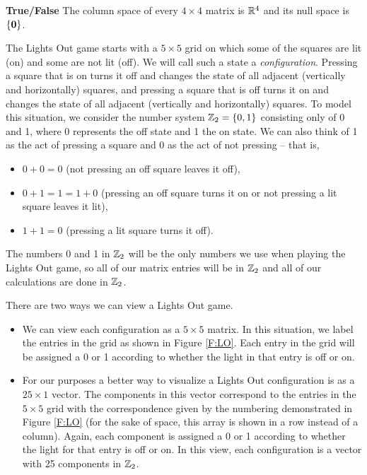 \item \textbf{True/False} The column space of every $4\times 4$ matrix is $\mathbb{R}^4$ and its null space is $\{\mathbf{0}\}$.

\ea

\ee

\label{sec:proj_lights_out}
The Lights Out game starts with a $5 \times 5$ grid on which some of the squares are lit (on) and some are not lit (off). We will call such a state a \emph{configuration}. Pressing a square that is on turns it off and changes the state of all adjacent (vertically and horizontally) squares, and pressing a square that is off turns it on and changes the state of all adjacent (vertically and horizontally) squares. To model this situation, we consider the number system $\mathbb{Z}_2 = \{0,1\}$ consisting only of 0 and 1, where 0 represents the off state and 1 the on state. We can also think of 1 as the act of pressing a square and 0 as the act of not pressing -- that is,
\begin{itemize}
\item $0+0 = 0$ (not pressing an off square leaves it off),
\item $0+1 = 1 = 1 + 0$ (pressing an off square turns it on or not pressing a lit square leaves it lit),
\item $1+1 = 0$ (pressing a lit square turns it off).
\end{itemize}

The numbers 0 and 1 in $\mathbb{Z}_2$ will be the only numbers we use when playing the Lights Out game, so all of our matrix entries will be in $\mathbb{Z}_2$ and all of our calculations are done in $\mathbb{Z}_2$. 

There are two ways we can view a Lights Out game.
\begin{itemize}
\item We can view each configuration as a $5 \times 5$ matrix. In this situation, we label the entries in the grid as shown in Figure \ref{F:LO}. Each entry in the grid will be assigned a 0 or 1 according to whether the light in that entry is off or on.

\item For our purposes a better way to visualize a Lights Out configuration is as a $25 \times 1$ vector. The components in this vector correspond to the entries in the $5 \times 5$ grid with the correspondence given by the numbering demonstrated in Figure \ref{F:LO} (for the sake of space, this array is shown in a row instead of a column). Again, each component is assigned a 0 or 1 according to whether the light for that entry is off or on. In this view, each configuration is a vector with 25 components in $\mathbb{Z}_2$.
\end{itemize}

